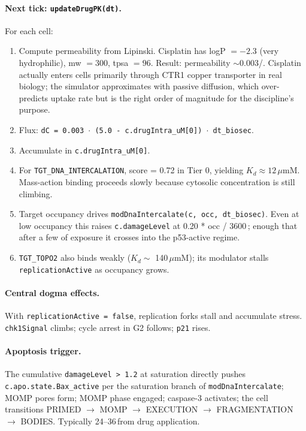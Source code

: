 \documentclass[11pt,letterpaper,twoside,openany]{book}
\newcommand{\code}[1]{\texttt{#1}}
\newcommand{\bioh}{\text{bio-h}}
\newcommand{\biosec}{\text{bio-s}}
\newcommand{\um}{\ensuremath{\mu\text{m}}}
\begin{document}
\paragraph{Next tick: \code{updateDrugPK(dt)}.} For each cell:
\begin{enumerate}
  \item Compute permeability from Lipinski. Cisplatin has
        logP $= -2.3$ (very hydrophilic), mw $= 300$, tpsa $= 96$.
        Result: permeability $\sim$0.003/\biosec. Cisplatin
        actually enters cells primarily through CTR1 copper
        transporter in real biology; the simulator approximates
        with passive diffusion, which over-predicts uptake rate
        but is the right order of magnitude for the discipline's
        purpose.
  \item Flux: \code{dC = 0.003 \(\cdot\) (5.0 - c.drugIntra\_uM[0])
        \(\cdot\) dt\_biosec}.
  \item Accumulate in \code{c.drugIntra\_uM[0]}.
  \item For \code{TGT\_DNA\_INTERCALATION}, score = 0.72 in
        Tier 0, yielding $K_d \approx 12\,\um$M. Mass-action
        binding proceeds slowly because cytosolic concentration is
        still climbing.
  \item Target occupancy drives \code{modDnaIntercalate(c, occ,
        dt\_biosec)}. Even at low occupancy this raises
        \code{c.damageLevel} at 0.20 * occ / 3600\,\biosec; enough
        that after a few \bioh of exposure it crosses into the
        p53-active regime.
  \item \code{TGT\_TOPO2} also binds weakly ($K_d \sim$ 140\,\um M);
        its modulator stalls \code{replicationActive} as occupancy
        grows.
\end{enumerate}

\paragraph{Central dogma effects.} With \code{replicationActive =
false}, replication forks stall and accumulate stress. \code{chk1Signal}
climbs; cycle arrest in G2 follows; \code{p21} rises.

\paragraph{Apoptosis trigger.} The cumulative \code{damageLevel >
1.2} at saturation directly pushes \code{c.apo.state.Bax\_active}
per the saturation branch of \code{modDnaIntercalate}; MOMP pores
form; MOMP phase engaged; caspase-3 activates; the cell transitions
PRIMED $\to$ MOMP $\to$ EXECUTION $\to$ FRAGMENTATION $\to$
BODIES. Typically 24--36\,\bioh from drug application.
\end{document}
